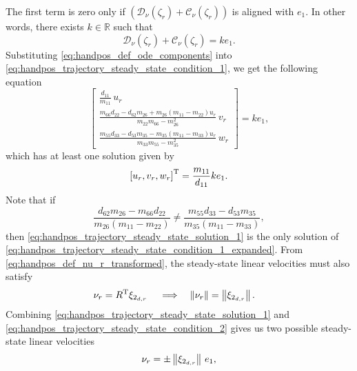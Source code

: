 The first term is zero only if $\left(\mathcal{D}_{\nu}(\zeta_r) + \mathcal{C}_{\nu}(\zeta_r)\right)$ is aligned with $e_1$.
In other words, there exists $k \in \mathbb{R}$ such that
\begin{equation}
    \mathcal{D}_{\nu}(\zeta_r) + \mathcal{C}_{\nu}(\zeta_r) = k e_1. \label{eq:handpos_trajectory_steady_state_condition_1}
\end{equation}
Substituting \eqref{eq:handpos_def_ode_components} into \eqref{eq:handpos_trajectory_steady_state_condition_1}, we get the following equation
\begin{equation}
    \begin{bmatrix}
        \frac{d_{11}}{m_{11}}\,u_r \\
        \frac{m_{66}d_{22} - d_{62}m_{26} + m_{26}\left(m_{11} - m_{22}\right)u_r}{m_{22}m_{66} - m_{26}^2}\,v_r \\
        \frac{m_{55}d_{33} - d_{53}m_{35} - m_{35}\left(m_{11} - m_{33}\right)u_r}{m_{33}m_{55} - m_{35}^2}\,w_r
    \end{bmatrix}
     = k e_1, \label{eq:handpos_trajectory_steady_state_condition_1_expanded}
\end{equation}
which has at least one solution given by
\begin{equation}
    \left[u_r, v_r, w_r\right]^{\mathrm{T}} = \frac{m_{11}}{d_{11}} k e_1. \label{eq:handpos_trajectory_steady_state_solution_1}
\end{equation}
Note that if
\begin{equation}
    \frac{d_{62}m_{26} - m_{66}d_{22}}{m_{26}\left(m_{11} - m_{22}\right)}
    \neq
    \frac{m_{55}d_{33} - d_{53}m_{35}}{m_{35}\left(m_{11} - m_{33}\right)},
    \label{eq:handpos_trajectory_inequality}
\end{equation}
then \eqref{eq:handpos_trajectory_steady_state_solution_1} is the only solution of \eqref{eq:handpos_trajectory_steady_state_condition_1_expanded}.
From \eqref{eq:handpos_def_nu_r_transformed}, the steady-state linear velocities must also satisfy
\begin{align}
    \nu_r &= R^{\mathrm{T}} \xi_{2_{d, r}}& &\implies& \left\|\nu_r\right\| &= \left\|\xi_{2_{d, r}}\right\|. \label{eq:handpos_trajectory_steady_state_condition_2}
\end{align}
Combining \eqref{eq:handpos_trajectory_steady_state_solution_1} and \eqref{eq:handpos_trajectory_steady_state_condition_2} gives us two possible steady-state linear velocities
\begin{equation}
    \nu_r = \pm \left\|\xi_{2_{d, r}}\right\|\,e_1,
\end{equation}
